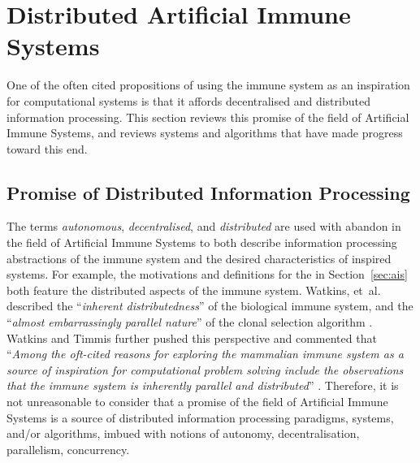 %
%
\section{Distributed Artificial Immune Systems}
\label{sec:background:distributedais}
One of the often cited propositions of using the immune system as an inspiration for computational systems is that it affords decentralised and distributed information processing. This section reviews this promise of the field of Artificial Immune Systems, and reviews systems and algorithms that have made progress toward this end. 

%
%
\subsection{Promise of Distributed Information Processing}
\label{subsec:background:distributedais:promise}
The terms \emph{autonomous}, \emph{decentralised}, and \emph{distributed} are used with abandon in the field of Artificial Immune Systems to both describe information processing abstractions of the immune system and the desired characteristics of inspired systems. For example, the motivations and definitions for the in Section~\ref{sec:ais} both feature the distributed aspects of the immune system. Watkins, et~al. described the ``\emph{inherent distributedness}'' of the biological immune system, and the ``\emph{almost embarrassingly parallel nature}'' of the clonal selection algorithm \cite{Watkins2003}. Watkins and Timmis further pushed this perspective and commented that ``\emph{Among the oft-cited reasons for exploring the mammalian immune system as a source of inspiration for computational problem solving include the observations that the immune system is inherently parallel and distributed}'' \cite{Watkins2004}. Therefore, it is not unreasonable to consider that a promise of the field of Artificial Immune Systems is a source of distributed information processing paradigms, systems, and/or algorithms, imbued with notions of autonomy, decentralisation, parallelism, concurrency.

